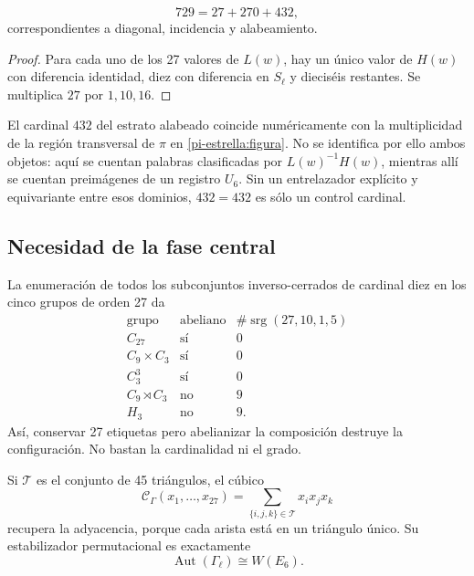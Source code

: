 \begin{theorem}
\label{p12-83-c20-s6:thm:particion-hensel-schlafli-nueva}
\begin{equation}
 729=27+270+432,
 \label{p12-83-c20-s6:eq:particion-729-e6-nueva}
\end{equation}
correspondientes a diagonal, incidencia y alabeamiento.
\end{theorem}

\begin{proof}
Para cada uno de los 27 valores de \(L(w)\), hay un único valor de
\(H(w)\) con diferencia identidad, diez con diferencia en \(S_\ell\) y
dieciséis restantes. Se multiplica \(27\) por \(1,10,16\).
\end{proof}

El cardinal \(432\) del estrato alabeado coincide numéricamente con la
multiplicidad de la región transversal de \(\pi\) en
\cref{pi-estrella:figura}. No se identifica por ello ambos objetos: aquí
se cuentan palabras clasificadas por \(L(w)^{-1}H(w)\), mientras allí se
cuentan preimágenes de un registro \(U_6\). Sin un entrelazador explícito y
equivariante entre esos dominios, \(432=432\) es sólo un control cardinal.

\subsection{Necesidad de la fase central}

La enumeración de todos los subconjuntos inverso-cerrados de cardinal diez
en los cinco grupos de orden 27 da
\[
\begin{array}{c|c|c}
\text{grupo}&\text{abeliano}&
\#\operatorname{srg}(27,10,1,5)\\ \hline
C_{27}&\text{sí}&0\\
C_9\times C_3&\text{sí}&0\\
C_3^3&\text{sí}&0\\
C_9\rtimes C_3&\text{no}&9\\
H_3&\text{no}&9.
\end{array}
\]
Así, conservar 27 etiquetas pero abelianizar la composición destruye la
configuración. No bastan la cardinalidad ni el grado.

Si \(\mathcal T\) es el conjunto de 45 triángulos, el cúbico
\[
 \mathcal C_\Gamma(x_1,\ldots,x_{27})
 =\sum_{\{i,j,k\}\in\mathcal T}x_ix_jx_k
\]
recupera la adyacencia, porque cada arista está en un triángulo único. Su
estabilizador permutacional es exactamente
\[
 \operatorname{Aut}(\Gamma_\ell)\cong W(E_6).
\]

